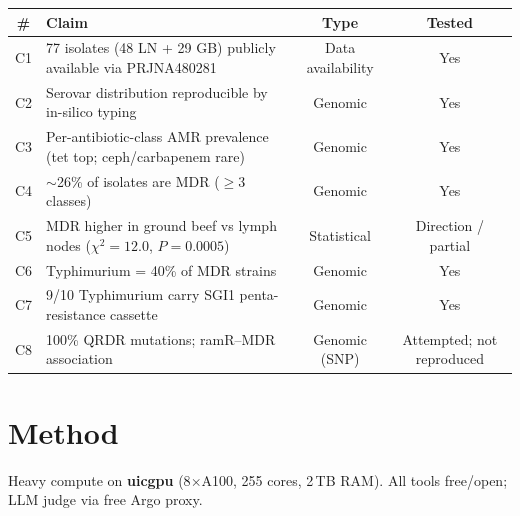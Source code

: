 \documentclass[11pt]{article}
\begin{document}
\begin{longtable}{clcc}
\toprule
\# & Claim & Type & Tested \\
\midrule
C1 & 77 isolates (48 LN + 29 GB) publicly available via PRJNA480281 & Data availability & Yes \\
C2 & Serovar distribution reproducible by in-silico typing & Genomic & Yes \\
C3 & Per-antibiotic-class AMR prevalence (tet top; ceph/carbapenem rare) & Genomic & Yes \\
C4 & $\sim$26\% of isolates are MDR ($\geq$3 classes) & Genomic & Yes \\
C5 & MDR higher in ground beef vs lymph nodes ($\chi^2=12.0$, $P=0.0005$) & Statistical & Direction / partial \\
C6 & Typhimurium = 40\% of MDR strains & Genomic & Yes \\
C7 & 9/10 Typhimurium carry SGI1 penta-resistance cassette & Genomic & Yes \\
C8 & 100\% QRDR mutations; ramR--MDR association & Genomic (SNP) & Attempted; not reproduced \\
\bottomrule
\end{longtable}

\section{Method}

Heavy compute on \textbf{uicgpu} (8$\times$A100, 255 cores, 2\,TB RAM). All tools free/open; LLM judge via
free Argo proxy.
\end{document}
